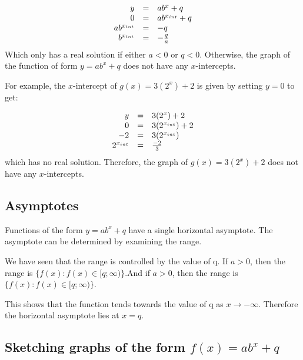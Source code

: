 \begin{equation*}
\begin{array}{ccc}\hfill y& =& ab^{x}+q\hfill \\
 \hfill 0& =& ab^{{x}_{int}}+q\hfill \\
 \hfill ab^{{x}_{int}}& =& -q\hfill \\
 \hfill b^{{x}_{int}}& =& -\frac{q}{a}\hfill 
\end{array}
\end{equation*}
Which only has a real solution if either $a<0$ or $q<0$. Otherwise, the graph of the function of form $y=ab^{x}+q$ does not have any $x$-intercepts.\par 
For example, the $x$-intercept of $g(x)=3(2^{x})+2$ is given by setting $y=0$ to get:\par 

\begin{equation*}
\begin{array}{ccc}\hfill y& =& 3({2}^{x})+2\hfill \\
 \hfill 0& =& 3(2^{{x}_{int}})+2\hfill \\
 \hfill -2& =& 3(2^{{x}_{int}})\hfill \\
 \hfill {2}^{{x}_{int}}& =& \frac{-2}{3}\hfill 
\end{array}
\end{equation*}
which has no real solution. Therefore, the graph of $g(x)=3({2}^{x})+2$ does not have any $x$-intercepts.\par 

\subsection*{Asymptotes}

Functions of the form $y=ab^{x}+q$ have a single horizontal asymptote. The asymptote can be determined by examining the range.\par 
We have seen that the range is controlled by the value of q. If $a>0$, then the range is $\{f(x):f(x)\in [q;\infty )\}$.And if $a>0$, then the range is $\{f(x):f(x)\in [q;\infty )\}$.\par 
This shows that the function tends towards the value of q as $x\to -\infty $. Therefore the horizontal asymptote lies at $x=q$.
\par 

\subsection*{Sketching graphs of the form $f(x)=ab^{x}+q$}

